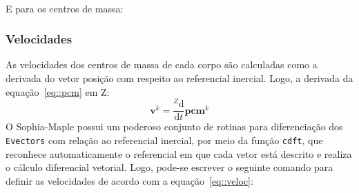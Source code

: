 \medskip {} \\
 \medskip 

E para os centros de massa:

\medskip {} \medskip 


\subsubsection{Velocidades}

As velocidades dos centros de massa de cada corpo são calculadas como a derivada
do vetor posição com respeito ao referencial inercial. Logo, a derivada da
equação~\ref{eq::pcm} em Z:
%
\begin{equation}
	\mathbf{v}^{k} = \frac{^{Z}\mathrm{d} }{\mathrm{d} t}
	\mathbf{pcm}^{k} \label{eq::veloc}
\end{equation}
%
O Sophia-Maple possui um poderoso conjunto de rotinas para diferenciação dos
\texttt{Evectors} com relação ao referencial inercial, por meio da função
\texttt{cdft}, que reconhece automaticamente o referencial em que cada vetor
está descrito e realiza o cálculo diferencial vetorial. Logo, pode-se escrever o
seguinte comando para definir as velocidades de acordo com a
equação~\ref{eq::veloc}:

\medskip {} \medskip 

